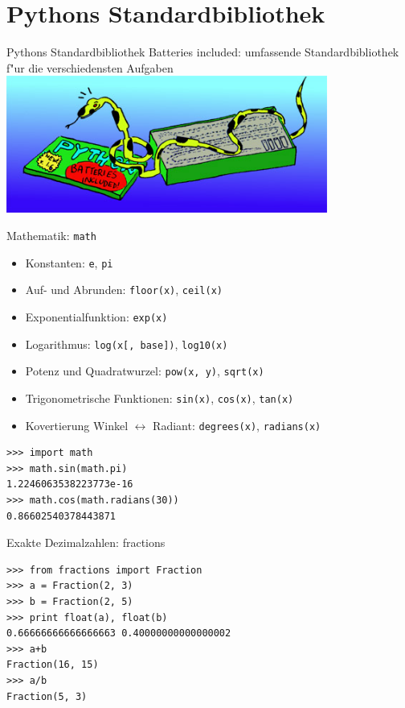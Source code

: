\section{Pythons Standardbibliothek}

\begin{frame}{Pythons Standardbibliothek}
\alert{\glqq Batteries included\grqq}: umfassende Standardbibliothek f"ur die verschiedensten Aufgaben\\[4mm]

\includegraphics[height=4.5cm]{images/batteries_included.jpg}
\end{frame}

\begin{frame}[fragile]{Mathematik: \texttt{math}}
\begin{itemize}
\item Konstanten: \texttt{e}, \texttt{pi}
\item Auf- und Abrunden: \texttt{floor(x)}, \texttt{ceil(x)}
\item Exponentialfunktion: \texttt{exp(x)}
\item Logarithmus: \texttt{log(x[, base])}, \texttt{log10(x)}
\item Potenz und Quadratwurzel: \texttt{pow(x, y)}, \texttt{sqrt(x)}
\item Trigonometrische Funktionen: \texttt{sin(x)}, \texttt{cos(x)}, \texttt{tan(x)}
\item Kovertierung Winkel $\leftrightarrow$ Radiant: \texttt{degrees(x)}, \texttt{radians(x)}
\end{itemize}
\begin{lstlisting}[style=Shell]
>>> import math
>>> math.sin(math.pi)
1.2246063538223773e-16
>>> math.cos(math.radians(30))
0.86602540378443871
\end{lstlisting}
\end{frame}


\begin{frame}[fragile]{Exakte Dezimalzahlen: fractions}

\begin{lstlisting}
>>> from fractions import Fraction
>>> a = Fraction(2, 3)
>>> b = Fraction(2, 5)
>>> print float(a), float(b)
0.66666666666666663 0.40000000000000002
>>> a+b
Fraction(16, 15)
>>> a/b
Fraction(5, 3)
\end{lstlisting}
\end{frame}



